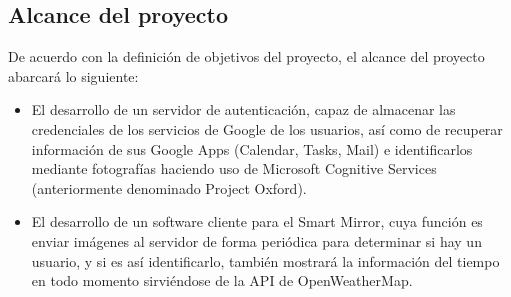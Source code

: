 \subsection{Alcance del proyecto}

De acuerdo con la definición de objetivos del proyecto, el alcance del proyecto abarcará lo siguiente:

\begin{itemize}
	\item El desarrollo de un servidor de autenticación, capaz de almacenar las credenciales de los servicios de Google de los usuarios, así como de recuperar información de sus Google Apps (Calendar, Tasks, Mail) e identificarlos mediante fotografías haciendo uso de Microsoft Cognitive Services (anteriormente denominado Project Oxford).
	
	\item El desarrollo de un software cliente para el Smart Mirror, cuya función es enviar imágenes al servidor de forma periódica para determinar si hay un usuario, y si es así identificarlo, también mostrará la información del tiempo en todo momento sirviéndose de la API de OpenWeatherMap.

\end{itemize}